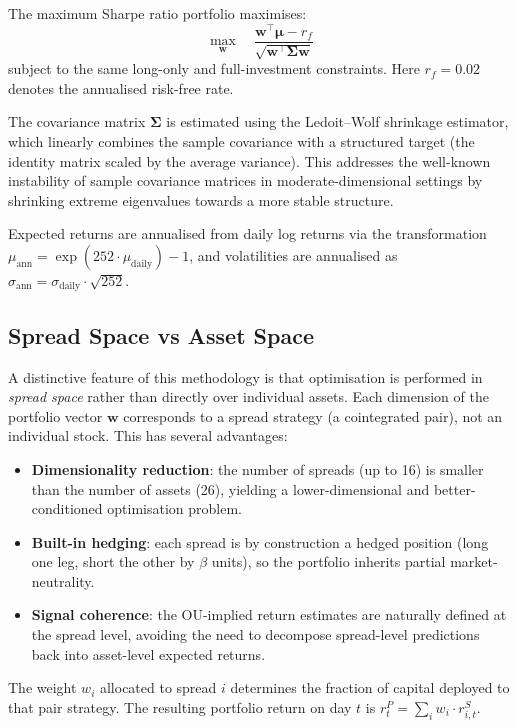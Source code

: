 \documentclass[a4paper]{report}
\begin{document}
The maximum Sharpe ratio portfolio maximises:
\begin{equation}
\max_{\mathbf{w}} \quad \frac{\mathbf{w}^\top \boldsymbol{\mu} - r_f}{\sqrt{\mathbf{w}^\top \boldsymbol{\Sigma} \mathbf{w}}}
\label{eq:max_sharpe}
\end{equation}
subject to the same long-only and full-investment constraints. Here $r_f = 0.02$ denotes the annualised risk-free rate.

The covariance matrix $\boldsymbol{\Sigma}$ is estimated using the Ledoit--Wolf shrinkage estimator, which linearly combines the sample covariance with a structured target (the identity matrix scaled by the average variance). This addresses the well-known instability of sample covariance matrices in moderate-dimensional settings by shrinking extreme eigenvalues towards a more stable structure.

Expected returns are annualised from daily log returns via the transformation $\mu_{\text{ann}} = \exp(252 \cdot \mu_{\text{daily}}) - 1$, and volatilities are annualised as $\sigma_{\text{ann}} = \sigma_{\text{daily}} \cdot \sqrt{252}$.

\subsection{Spread Space vs Asset Space}

A distinctive feature of this methodology is that optimisation is performed in \emph{spread space} rather than directly over individual assets. Each dimension of the portfolio vector $\mathbf{w}$ corresponds to a spread strategy (a cointegrated pair), not an individual stock. This has several advantages:
\begin{itemize}
    \item \textbf{Dimensionality reduction}: the number of spreads (up to 16) is smaller than the number of assets (26), yielding a lower-dimensional and better-conditioned optimisation problem.
    \item \textbf{Built-in hedging}: each spread is by construction a hedged position (long one leg, short the other by $\beta$ units), so the portfolio inherits partial market-neutrality.
    \item \textbf{Signal coherence}: the OU-implied return estimates are naturally defined at the spread level, avoiding the need to decompose spread-level predictions back into asset-level expected returns.
\end{itemize}

The weight $w_i$ allocated to spread $i$ determines the fraction of capital deployed to that pair strategy. The resulting portfolio return on day $t$ is $r_t^P = \sum_i w_i \cdot r_{i,t}^{S}$.
\end{document}
